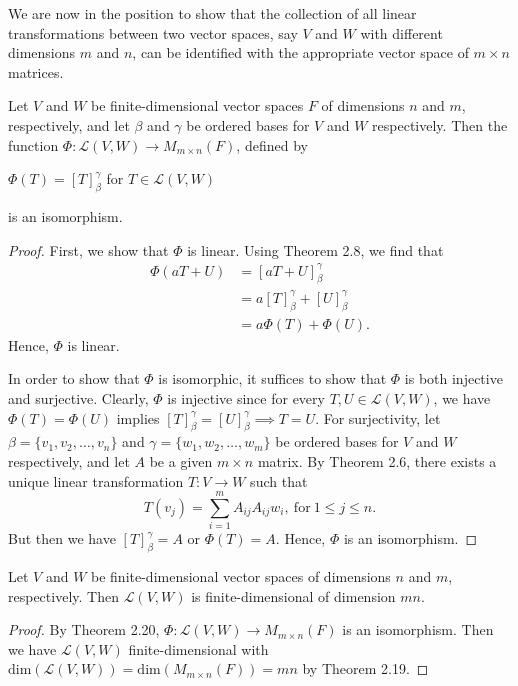 We are now in the position to show that the collection of all linear transformations between two vector spaces, say \( V  \) and \( W  \) with different dimensions \( m  \) and \( n \), can be identified with the appropriate vector space of \( m \times n  \) matrices.

\begin{theorem}
    Let \( V  \) and \( W  \) be finite-dimensional vector spaces \( F  \) of dimensions \( n  \) and \( m  \), respectively, and let \( \beta  \) and \( \gamma  \) be ordered bases for \( V  \) and \( W  \) respectively. Then the function \( \Phi: \mathcal{L}(V,W) \to {M}_{m \times n}(F)   \), defined by  
    \begin{center}
        \( \Phi(T) = [T]_{\beta}^{\gamma}  \) for \( T \in \mathcal{L}(V,W) \)
    \end{center}
    is an isomorphism.
\end{theorem}
\begin{proof}
First, we show that \( \Phi  \) is linear. Using Theorem 2.8, we find that 
\begin{align*}
    \Phi (aT+U) &= [aT + U]_{\beta}^{\gamma}  \\
                &= a [T]_{\beta}^{\gamma}  + [U]_{\beta}^{\gamma} \\
                &= a \Phi(T) + \Phi(U).
\end{align*}
Hence, \( \Phi  \) is linear.

In order to show that \( \Phi  \) is isomorphic, it suffices to show that \( \Phi  \) is both injective and surjective. Clearly, \( \Phi  \) is injective since for every \( T,U \in \mathcal{L}(V,W) \), we have \( \Phi(T) = \Phi(U)  \) implies \( [T]_{\beta}^{\gamma}  = [U]_{\beta}^{\gamma} \implies T = U   \). For surjectivity, let \( \beta = \{ {v}_{1}, {v}_{2}, \dots, {v}_{n} \}  \) and \( \gamma = \{ {w}_{1}, {w}_{2}, \dots, {w}_{m} \}  \) be ordered bases for \( V  \) and \( W \) respectively, and let \( A  \) be a given \( m \times n  \) matrix. By Theorem 2.6, there exists a unique linear transformation \( T: V \to W  \) such that 
\[  T({v}_{j}) = \sum_{ i=1 }^{ m  } {A}_{ij} {A}_{ij} {w}_{i}, \ \text{for} \ 1 \leq j \leq n. \]
But then we have  \( [T]_{\beta}^{\gamma} = A  \) or \( \Phi(T) = A  \). Hence, \( \Phi  \) is an isomorphism. 
\end{proof}

\begin{corollary}
    Let \( V  \) and \( W  \) be finite-dimensional vector spaces of dimensions \( n  \) and \( m  \), respectively. Then \( \mathcal{L}(V,W) \) is finite-dimensional of dimension \( mn  \).
\end{corollary} 
\begin{proof}
    By Theorem 2.20, \( \Phi: \mathcal{L}(V,W) \to {M}_{m \times n}(F) \) is an isomorphism. Then we have \( \mathcal{L}(V,W) \) finite-dimensional with  \( \text{dim}(\mathcal{L}(V,W)) = \text{dim}({M}_{m \times n }(F)) = mn  \) by Theorem 2.19.
\end{proof}

